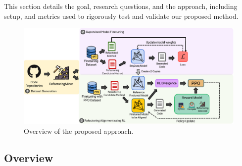 \noindent

This section details the goal, research questions, and the approach, including setup, and metrics used to rigorously test and validate our proposed method.

\begin{figure}
\centering
\centerline{\includegraphics[width=\textwidth]{chapters/generation/images/overview_cropped.pdf}}
\caption{Overview of the proposed approach.}
\label{fig:methodology}
\end{figure}

\subsection{Overview}

